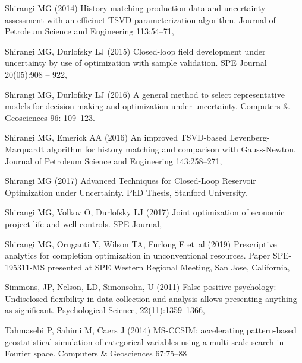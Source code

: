 \documentclass[11pt]{article}
\begin{document}
\begin{thebibliography}{51}
Shirangi MG (2014) History matching production data and uncertainty assessment
  with an efficinet {TSVD} parameterization algorithm. Journal of Petroleum
  Science and Engineering 113:54--71, 

Shirangi MG, Durlofsky LJ (2015) Closed-loop field development under
  uncertainty by use of optimization with sample validation. SPE Journal
  20(05):908 -- 922, 

Shirangi MG,  Durlofsky LJ (2016) A general method to select representative models for decision making
  and optimization under uncertainty.
Computers \& Geosciences 96: 109--123.

Shirangi MG, Emerick AA (2016) An improved {TSVD}-based {Levenberg-Marquardt}
  algorithm for history matching and comparison with {Gauss-Newton}.
Journal of Petroleum Science and Engineering 143:258--271,

Shirangi MG (2017) Advanced Techniques for Closed-Loop Reservoir Optimization under Uncertainty.
PhD Thesis, Stanford University.

Shirangi MG, Volkov O, Durlofsky LJ (2017) Joint optimization of economic project life and well controls.
SPE Journal, 

Shirangi MG, Oruganti Y, Wilson TA, Furlong E et~al (2019)
Prescriptive analytics for completion optimization in unconventional resources.
Paper SPE-195311-MS presented at SPE Western Regional Meeting, San Jose, California,

Simmons, JP, Nelson, LD, Simonsohn, U (2011) False-positive psychology: Undisclosed flexibility in data collection and analysis allows presenting anything as significant.
Psychological Science, 22(11):1359--1366,

Tahmasebi P, Sahimi M, Caers J (2014) {MS-CCSIM}: accelerating pattern-based
  geostatistical simulation of categorical variables using a multi-scale search
  in Fourier space. Computers \& Geosciences 67:75--88


\end{thebibliography}
\end{document}
